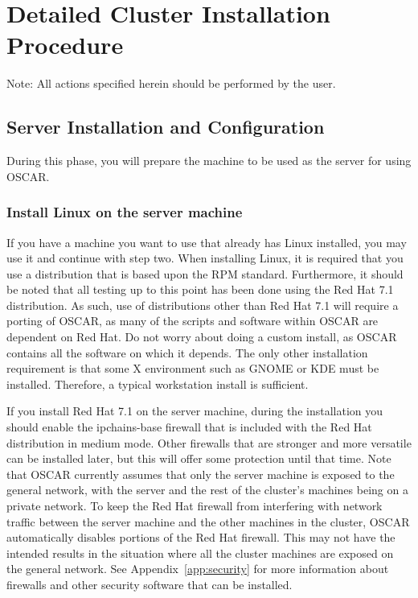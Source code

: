%
%
%

\section{Detailed Cluster Installation Procedure}

Note: All actions specified herein should be performed by the
 user.


\subsection{Server Installation and Configuration}
  
During this phase, you will prepare the machine to be used as the
server for using OSCAR.

\subsubsection{Install Linux on the server machine} 

If you have a machine you want to use that already has Linux
installed, you may use it and continue with step two. When installing
Linux, it is required that you use a distribution that is based upon
the RPM standard.  Furthermore, it should be noted that all testing up
to this point has been done using the Red Hat 7.1 distribution. As
such, use of distributions other than Red Hat 7.1 will require a
porting of OSCAR, as many of the scripts and software within OSCAR are
dependent on Red Hat. Do not worry about doing a custom install, as
OSCAR contains all the software on which it depends.  The only other
installation requirement is that some X environment such as GNOME or
KDE must be installed. Therefore, a typical workstation install is
sufficient.

\begchange
If you install Red Hat 7.1 on the server machine, during the
installation you should enable the ipchains-base firewall that is 
included with the Red Hat distribution in medium mode.
Other firewalls that are stronger and more versatile can be installed
later, but this will offer some protection until that time.
Note that OSCAR currently assumes that only the server machine is
exposed to the general network, with the server and the rest of the
cluster's machines being on a private network. To keep the Red Hat
firewall from interfering with network traffic between the server
machine and the other machines in the cluster, OSCAR automatically
disables portions of the Red Hat firewall. This may not have the
intended results in the situation where all the cluster machines
are exposed on the general network.
See Appendix~\ref{app:security} for more information about firewalls
and other security software that can be installed. 
\endchange
    
